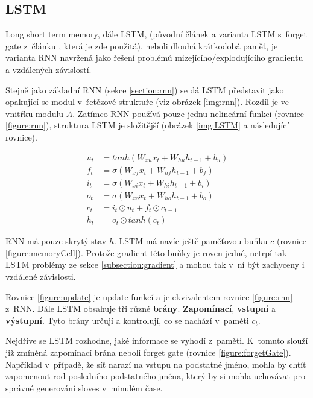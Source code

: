 \subsection{LSTM}\label{section:LSTM}
Long short term memory, dále LSTM, (původní článek \cite{LSTM} a varianta LSTM s~forget gate z~článku \cite{forgetLSTM}, která je zde použitá), neboli dlouhá krátkodobá paměť, je varianta RNN navržená jako řešení problémů mizejícího/explodujícího gradientu a vzdálených závislostí.

Stejně jako základní RNN (sekce \ref{section:rnn}) se dá LSTM představit jako opakující se modul v~řetězové struktuře (viz obrázek \ref{img:rnn}). Rozdíl je ve vnitřku modulu $A$. Zatímco RNN používá pouze jednu nelineární funkci (rovnice \ref{figure:rnn}), struktura LSTM je složitější (obrázek \ref{img:LSTM} a následující rovnice).

\begin{align}
    u_{t}&=tanh(W_{xu}x_t + W_{hu}h_{t-1} + b_u) \label{figure:update} \\
    f_{t}&=\sigma(W_{xf}x_{t}+W_{hf}h_{t-1}+b_{f}) \label{figure:forgetGate} \\
    i_{t}&=\sigma(W_{xi}x_{t}+W_{hi}h_{t-1}+b_{i}) \label{figure:inputGate} \\
    o_{t}&=\sigma(W_{xo}x_{t}+W_{ho}h_{t-1}+b_{o}) \label{figure:outputGate} \\
    c_{t}&=i_{t}\odot u_{t}+f_{t}\odot c_{t-1}\label{figure:memoryCell} \\
    h_{t}&=o_{t}\odot tanh(c_{t}) \label{figure:hiddenState}
\end{align}

RNN má pouze skrytý stav $h$. LSTM má navíc ještě paměťovou buňku $c$ (rovnice \ref{figure:memoryCell}). Protože gradient této buňky je roven jedné, netrpí tak LSTM problémy ze sekce \ref{subsection:gradient} a mohou tak v~ní být zachyceny i vzdálené závislosti.

Rovnice \ref{figure:update} je update funkcí a je ekvivalentem rovnice \ref{figure:rnn} z~RNN.
Dále LSTM obsahuje tři různé \textbf{brány}. \textbf{Zapomínací}, \textbf{vstupní} a \textbf{výstupní}. Tyto brány určují a kontrolují, co se nachází v~paměti $c_t$.

Nejdříve se LSTM rozhodne, jaké informace se vyhodí z~paměti. K~tomuto slouží již zmíněná zapomínací brána neboli forget gate (rovnice \ref{figure:forgetGate}). Například v~případě, že síť narazí na vstupu na podstatné jméno, mohla by chtít zapomenout rod posledního podstatného jména, který by si mohla uchovávat pro správné generování sloves v~minulém čase.

